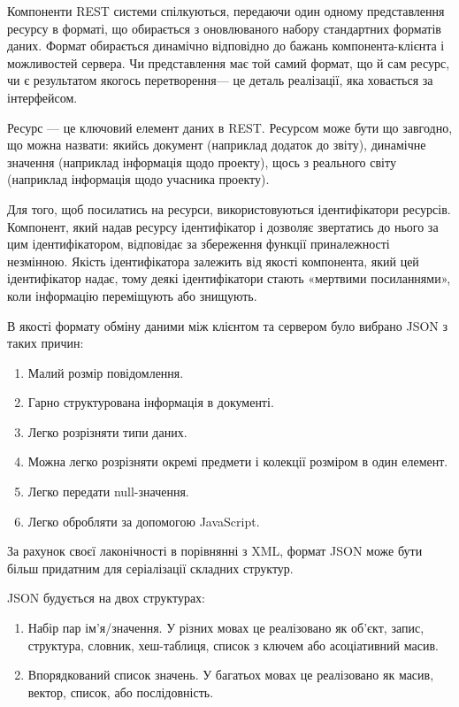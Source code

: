 \documentclass[../main.tex]{subfiles}
\begin{document}
		Компоненти REST системи спілкуються, передаючи один одному представлення ресурсу в форматі, що обирається з оновлюваного набору стандартних форматів даних. Формат обирається динамічно відповідно до бажань компонента-клієнта і можливостей сервера. Чи представлення має той самий формат, що й сам ресурс, чи є результатом якогось перетворення\nolinebreak[2] — це деталь реалізації, яка ховається за інтерфейсом.
		
		Ресурс — це ключовий елемент даних в REST. Ресурсом може бути що завгодно, що можна назвати: якийсь документ (наприклад додаток до звіту), динамічне значення (наприклад інформація щодо проекту), щось з реального світу (наприклад інформація щодо учасника проекту).
		
		Для того, щоб посилатись на ресурси, використовуються ідентифікатори ресурсів. Компонент, який надав ресурсу ідентифікатор і дозволяє звертатись до нього за цим ідентифікатором, відповідає за збереження функції приналежності незмінною. Якість ідентифікатора залежить від якості компонента, який цей ідентифікатор надає, тому деякі ідентифікатори стають «мертвими посиланнями», коли інформацію переміщують або знищують.
		
		В якості формату обміну даними між клієнтом та сервером було вибрано JSON з таких причин:
		\begin{enumerate}
			\item Малий розмір повідомлення.
			\item Гарно структурована інформація в документі.
			\item Легко розрізняти типи даних.
			\item Можна легко розрізняти окремі предмети і колекції розміром в один елемент.
			\item Легко передати null-значення.
			\item Легко обробляти за допомогою JavaScript.
		\end{enumerate}
		
		За рахунок своєї лаконічності в порівнянні з XML, формат JSON може бути більш придатним для серіалізації складних структур.
		
		JSON будується на двох структурах:
		\begin{enumerate}
			\item Набір пар ім'я/значення. У різних мовах це реалізовано як об'єкт, запис, структура, словник, хеш-таблиця, список з ключем або асоціативний масив.
			\item Впорядкований список значень. У багатьох мовах це реалізовано як масив, вектор, список, або послідовність.
		\end{enumerate}
		
\end{document}
